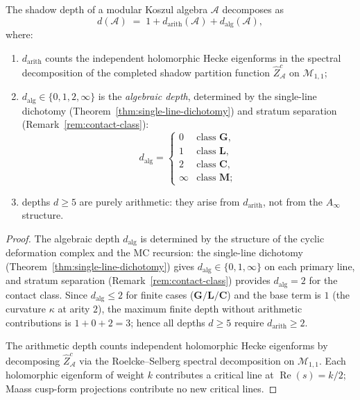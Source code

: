 \begin{theorem}
\label{thm:depth-decomposition}
The shadow depth of a modular Koszul algebra $\mathcal{A}$
decomposes as
\begin{equation}
\label{eq:depth-decomposition}
 d(\mathcal{A}) \;=\; 1 + d_{\mathrm{arith}}(\mathcal{A})
 + d_{\mathrm{alg}}(\mathcal{A}),
\end{equation}
where:
\begin{enumerate}[label=\textup{(\roman*)}]
\item $d_{\mathrm{arith}}$ counts the independent holomorphic
 Hecke eigenforms in the spectral decomposition of the completed
 shadow partition function $\widehat{Z}^c_{\mathcal{A}}$
 on $\mathcal{M}_{1,1}$;

\item $d_{\mathrm{alg}} \in \{0, 1, 2, \infty\}$ is the
 \emph{algebraic depth}, determined by the single-line dichotomy
 \textup{(}Theorem~\textup{\ref{thm:single-line-dichotomy}}\textup{)}
 and stratum separation
 \textup{(}Remark~\textup{\ref{rem:contact-class}}\textup{)}:
 \[
 d_{\mathrm{alg}} =
 \begin{cases}
 0 & \text{class } \mathbf{G}, \\
 1 & \text{class } \mathbf{L}, \\
 2 & \text{class } \mathbf{C}, \\
 \infty & \text{class } \mathbf{M};
 \end{cases}
 \]

\item depths $d \geq 5$ are purely arithmetic: they arise from
 $d_{\mathrm{arith}}$, not from the $A_\infty$ structure.
\end{enumerate}
\end{theorem}

\begin{proof}
The algebraic depth $d_{\mathrm{alg}}$ is determined by the
structure of the cyclic deformation complex and the MC recursion:
the single-line dichotomy
(Theorem~\ref{thm:single-line-dichotomy}) gives
$d_{\mathrm{alg}} \in \{0, 1, \infty\}$ on each primary line,
and stratum separation (Remark~\ref{rem:contact-class}) provides
$d_{\mathrm{alg}} = 2$ for the contact class.
Since $d_{\mathrm{alg}} \leq 2$ for finite cases
($\mathbf{G}/\mathbf{L}/\mathbf{C}$) and the base term
is $1$ (the curvature $\kappa$ at arity $2$), the maximum
finite depth without arithmetic contributions is
$1 + 0 + 2 = 3$; hence all depths $d \geq 5$ require
$d_{\mathrm{arith}} \geq 2$.

The arithmetic depth counts independent holomorphic Hecke
eigenforms by decomposing $\widehat{Z}^c_{\mathcal{A}}$
via the Roelcke--Selberg spectral decomposition on
$\mathcal{M}_{1,1}$. Each holomorphic eigenform of weight $k$
contributes a critical line at $\operatorname{Re}(s) = k/2$;
Maass cusp-form projections contribute no new critical lines.
\end{proof}

